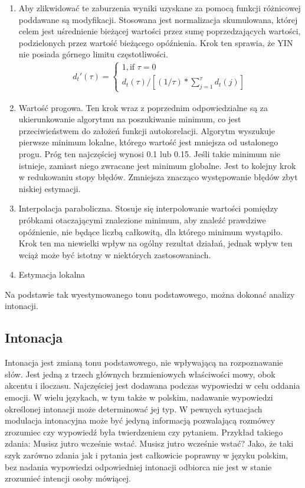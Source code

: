 \documentclass[a4paper,12 pt]{article}
\begin{document}
\begin{enumerate}
\item Aby zlikwidować te zaburzenia wyniki uzyskane za pomocą funkcji różnicowej poddawane są modyfikacji. Stosowana jest normalizacja skumulowana, której celem jest uśrednienie bieżącej wartości przez sumę poprzedzających wartości, podzielonych przez wartość bieżącego opóźnienia. Krok ten sprawia, że YIN nie posiada górnego limitu częstotliwości.
\begin{gather*}
d_{t}'(\tau) =
\begin{cases}
  1,  \text{if }\tau=0 \\
  d_{t}(\tau)/[ (1/\tau) * \sum\limits_{j=1}^{\tau}d_{t}(j)]
\end{cases}
\end{gather*}
\item Wartość progowa. Ten krok wraz z poprzednim odpowiedzialne są za ukierunkowanie algorytmu na poszukiwanie minimum, co jest przeciwieństwem do założeń funkcji autokorelacji. Algorytm wyszukuje pierwsze minimum lokalne, którego wartość jest mniejsza od ustalonego progu. Próg ten najczęściej wynosi 0.1 lub 0.15. Jeśli takie minimum nie istnieje, zamiast niego zwracane jest minimum globalne. Jest to kolejny krok w redukowaniu stopy błędów. Zmniejsza znacząco występowanie błędów zbyt niskiej estymacji.

\item Interpolacja paraboliczna. Stosuje się interpolowanie wartości pomiędzy próbkami otaczającymi znalezione minimum, aby znaleźć prawdziwe opóźnienie, nie będące liczbą całkowitą, dla którego minimum wystąpiło. Krok ten ma niewielki wpływ na ogólny rezultat działań, jednak wpływ ten wciąż może być istotny w niektórych zastosowaniach.
\item Estymacja lokalna
\end{enumerate}
Na podstawie tak wyestymowanego tonu podstawowego, można dokonać analizy intonacji.
\subsection{Intonacja}
Intonacja jest zmianą tonu podstawowego, nie wpływającą na rozpoznawanie słów. Jest jedną z trzech głównych brzmieniowych właściwości mowy, obok akcentu i iloczasu. Najczęściej jest dodawana podczas wypowiedzi w celu oddania emocji. W wielu językach, w tym także w polskim, nadawanie wypowiedzi określonej intonacji może determinować jej typ. W pewnych sytuacjach modulacja intonacyjna może być jedyną informacją pozwalającą rozmówcy zrozumiec czy wypowiedź była twierdzeniem czy pytaniem. 
Przykład takiego zdania:
\newline Musisz jutro wcześnie wstać.
\newline Musisz jutro wcześnie wstać?
\newline Jako, że taki szyk zarówno zdania jak i pytania jest całkowicie poprawny w języku polskim, bez nadania wypowiedzi odpowiedniej intonacji odbiorca nie jest w stanie zrozumieć intencji osoby mówiącej.
\end{document}
